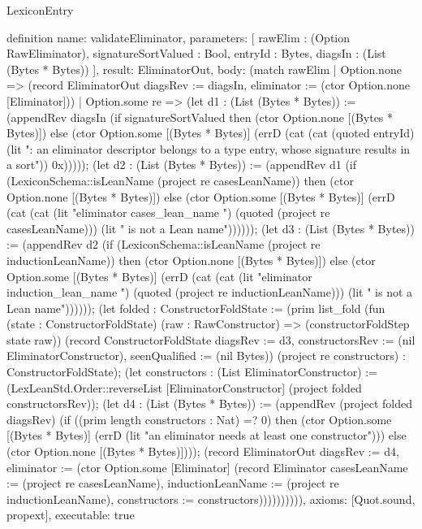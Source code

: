\begin{lexlean}{LexiconEntry}
\begin{semanticmodule}
definition{
  name: validateEliminator,
  parameters: [
    rawElim : (Option RawEliminator),
    signatureSortValued : Bool,
    entryId : Bytes,
    diagsIn : (List (Bytes * Bytes))
  ],
  result: EliminatorOut,
  body: (match rawElim
    | Option.none => (record EliminatorOut {diagsRev := diagsIn, eliminator := (ctor Option.none [Eliminator])})
    | Option.some re => (let d1 : (List (Bytes * Bytes)) := (appendRev diagsIn (if signatureSortValued then (ctor Option.none [(Bytes * Bytes)]) else (ctor Option.some [(Bytes * Bytes)] (errD (cat (cat (quoted entryId) (lit ": an eliminator descriptor belongs to a type entry, whose signature results in a sort")) 0x))))); (let d2 : (List (Bytes * Bytes)) := (appendRev d1 (if (LexiconSchema::isLeanName (project re casesLeanName)) then (ctor Option.none [(Bytes * Bytes)]) else (ctor Option.some [(Bytes * Bytes)] (errD (cat (cat (lit "eliminator cases_lean_name ") (quoted (project re casesLeanName))) (lit " is not a Lean name")))))); (let d3 : (List (Bytes * Bytes)) := (appendRev d2 (if (LexiconSchema::isLeanName (project re inductionLeanName)) then (ctor Option.none [(Bytes * Bytes)]) else (ctor Option.some [(Bytes * Bytes)] (errD (cat (cat (lit "eliminator induction_lean_name ") (quoted (project re inductionLeanName))) (lit " is not a Lean name")))))); (let folded : ConstructorFoldState := (prim list_fold (fun (state : ConstructorFoldState) (raw : RawConstructor) => (constructorFoldStep state raw)) (record ConstructorFoldState {diagsRev := d3, constructorsRev := (nil EliminatorConstructor), seenQualified := (nil Bytes)}) (project re constructors) : ConstructorFoldState); (let constructors : (List EliminatorConstructor) := (LexLeanStd.Order::reverseList [EliminatorConstructor] (project folded constructorsRev)); (let d4 : (List (Bytes * Bytes)) := (appendRev (project folded diagsRev) (if ((prim length constructors : Nat) =? 0) then (ctor Option.some [(Bytes * Bytes)] (errD (lit "an eliminator needs at least one constructor"))) else (ctor Option.none [(Bytes * Bytes)]))); (record EliminatorOut {diagsRev := d4, eliminator := (ctor Option.some [Eliminator] (record Eliminator {casesLeanName := (project re casesLeanName), inductionLeanName := (project re inductionLeanName), constructors := constructors}))})))))))),
  axioms: [Quot.sound, propext],
  executable: true
}


\end{semanticmodule}
\end{lexlean}
